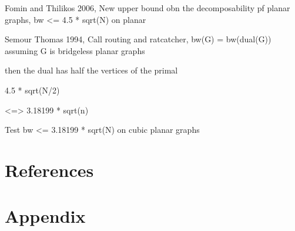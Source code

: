 \documentclass{article}
\begin{document}

	Fomin and Thilikos 2006, New upper bound obn the decomposability pf planar graphs, bw <= 4.5 * sqrt(N) on planar

	Semour Thomas 1994, Call routing and ratcatcher, bw(G) = bw(dual(G)) assuming G is bridgeless planar graphs

	then the dual has half the vertices of the primal

	4.5 * sqrt(N/2)

	<=> 3.18199 * sqrt(n)

	Test bw <= 3.18199 * sqrt(N) on cubic planar graphs


\newpage
\section{References}
	\printbibliography

\newpage
\section{Appendix}
\end{document}
